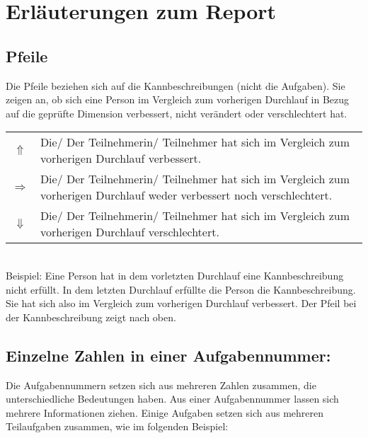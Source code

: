\documentclass{article}
\begin{document}
\setlength{\fboxsep}{0pt}%

\section*{Erläuterungen zum Report}
\subsection*{Pfeile}
Die Pfeile beziehen sich auf die Kannbeschreibungen (nicht die Aufgaben). Sie zeigen an, ob sich eine Person im Vergleich zum vorherigen Durchlauf in Bezug auf die geprüfte Dimension verbessert, nicht verändert oder verschlechtert hat.
\vspace{.5em}\\
\begin{tabular}{cl}
$\Uparrow$ & Die/ Der Teilnehmerin/ Teilnehmer hat sich im Vergleich zum vorherigen Durchlauf verbessert.\\
$\Rightarrow$ & Die/ Der Teilnehmerin/ Teilnehmer hat sich im Vergleich zum vorherigen Durchlauf weder verbessert noch verschlechtert.\\
$\Downarrow$ & Die/ Der Teilnehmerin/ Teilnehmer hat sich im Vergleich zum vorherigen Durchlauf verschlechtert.
\end{tabular}
\vspace{.5em}\\
\noindent Beispiel: Eine Person hat in dem vorletzten Durchlauf eine Kannbeschreibung nicht erfüllt. In dem letzten Durchlauf erfüllte die Person die Kannbeschreibung. Sie hat sich also im Vergleich zum vorherigen Durchlauf verbessert. Der Pfeil bei der Kannbeschreibung zeigt nach oben.


\subsection*{Einzelne Zahlen in einer Aufgabennummer:}
Die Aufgabennummern setzen sich aus mehreren Zahlen zusammen, die unterschiedliche Bedeutungen haben. Aus einer Aufgabennummer lassen sich mehrere Informationen ziehen. Einige Aufgaben setzen sich aus mehreren Teilaufgaben zusammen, wie im folgenden Beispiel:
\vspace{0.5em}\\
\end{document}
